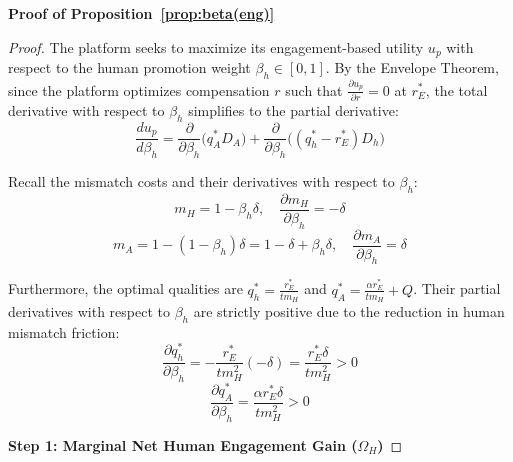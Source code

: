 \documentclass[mnsc,nonblindrev]{informs3_NoOR}
\begin{document}
\noindent\textbf{Proof of Proposition~\ref{prop:beta(eng)}}
\begin{proof}
The platform seeks to maximize its engagement-based utility $u_{p}$ with respect to the human promotion weight $\beta_{h} \in [0, 1]$. By the Envelope Theorem, since the platform optimizes compensation $r$ such that $\frac{\partial u_{p}}{\partial r} = 0$ at $r_{E}^{*}$, the total derivative with respect to $\beta_{h}$ simplifies to the partial derivative:
\begin{equation}
\frac{du_{p}}{d\beta_{h}} = \frac{\partial}{\partial\beta_{h}} \Big( q_{A}^{*}D_{A} \Big) + \frac{\partial}{\partial\beta_{h}} \Big( (q_{h}^{*} - r_{E}^{*})D_{h} \Big)
\end{equation}

Recall the mismatch costs and their derivatives with respect to $\beta_{h}$:
\begin{equation}
m_{H} = 1 - \beta_{h}\delta, \quad \frac{\partial m_{H}}{\partial\beta_{h}} = -\delta
\end{equation}
\begin{equation}
m_{A} = 1 - (1 - \beta_{h})\delta = 1 - \delta + \beta_{h}\delta, \quad \frac{\partial m_{A}}{\partial\beta_{h}} = \delta
\end{equation}

Furthermore, the optimal qualities are $q_{h}^{*} = \frac{r_{E}^{*}}{tm_{H}}$ and $q_{A}^{*} = \frac{\alpha r_{E}^{*}}{tm_{H}} + Q$. Their partial derivatives with respect to $\beta_{h}$ are strictly positive due to the reduction in human mismatch friction:
\begin{equation}
\frac{\partial q_{h}^{*}}{\partial\beta_{h}} = -\frac{r_{E}^{*}}{tm_{H}^{2}} (-\delta) = \frac{r_{E}^{*}\delta}{tm_{H}^{2}} > 0
\end{equation}
\begin{equation}
\frac{\partial q_{A}^{*}}{\partial\beta_{h}} = \frac{\alpha r_{E}^{*}\delta}{tm_{H}^{2}} > 0
\end{equation}

\vspace{0.5cm}
\noindent \textbf{Step 1: Marginal Net Human Engagement Gain ($\Omega_{H}$)}


\end{proof}
\end{document}

